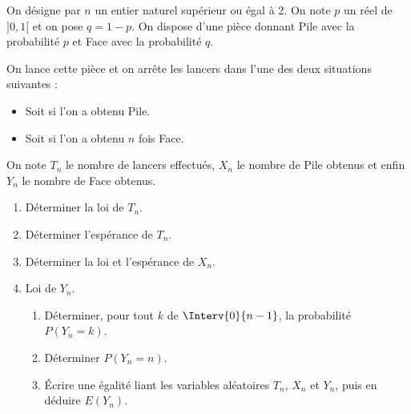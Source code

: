 \documentclass[a4paper,10pt]{report}
\begin{document}
\begin{Exercice}{} On désigne par $n$ un entier naturel supérieur ou égal à 2. On note $p$ un réel de $]0,1[$ et on pose $q = 1-p$. On dispose d'une pièce donnant Pile avec la probabilité $p$ et Face avec la probabilité $q$.

\noindent On lance cette pièce et on arrête les lancers dans l'une des deux situations suivantes :
\begin{itemize}
 \item Soit si l'on a obtenu Pile.
 \item Soit si l'on a obtenu $n$ fois Face.
\end{itemize}
%

\noindent On note $T_n$ le nombre de lancers effectués, $X_n$ le nombre de Pile obtenus et enfin $Y_n$ le nombre de Face obtenus. 
\begin{enumerate}
 \item  Déterminer la loi de $T_n$.
 \item  Déterminer l'espérance de $T_n$.
 \item Déterminer la loi et l'espérance de $X_n$.
 \item Loi de $Y_n$.
 \begin{enumerate}
  \item Déterminer, pour tout $k$ de $\Interv{0}{n-1}$, la probabilité $P(Y_n = k)$.
  \item Déterminer $P(Y_n = n)$.
  \item Écrire une égalité liant les variables aléatoires $T_n$, $X_n$ et $Y_n$, puis en déduire $E(Y_n)$.
\end{enumerate}
\end{enumerate}
\end{Exercice}
\end{document}
